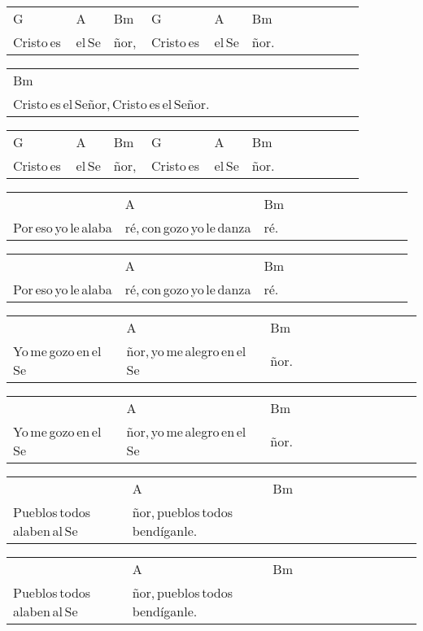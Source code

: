 \begin{multicols}{2}
\begin{minipage}{\columnwidth}
\noindent
\begin{tabular}{llllllllllll}
G&A&Bm&G&A&Bm\\
Cristo\,es\,&el\,Se&ñor,\,&Cristo\,es\,&el\,Se&ñor.
\end{tabular}

\noindent
\begin{tabular}{llllllllllll}
Bm\\
Cristo\,es\,el\,Señor,\,Cristo\,es\,el\,Señor.
\end{tabular}

\noindent
\begin{tabular}{llllllllllll}
G&A&Bm&G&A&Bm\\
Cristo\,es\,&el\,Se&ñor,\,&Cristo\,es\,&el\,Se&ñor.
\end{tabular}

\noindent
\begin{tabular}{llllllllllll}
&A&Bm\\
Por\,eso\,yo\,le\,alaba&ré,\,con\,gozo\,yo\,le\,danza&ré.
\end{tabular}

\noindent
\begin{tabular}{llllllllllll}
&A&Bm\\
Por\,eso\,yo\,le\,alaba&ré,\,con\,gozo\,yo\,le\,danza&ré.
\end{tabular}

\noindent
\begin{tabular}{llllllllllll}
&A&Bm\\
Yo\,me\,gozo\,en\,el\,Se&ñor,\,yo\,me\,alegro\,en\,el\,Se&ñor.
\end{tabular}

\noindent
\begin{tabular}{llllllllllll}
&A&Bm\\
Yo\,me\,gozo\,en\,el\,Se&ñor,\,yo\,me\,alegro\,en\,el\,Se&ñor.
\end{tabular}

\noindent
\begin{tabular}{llllllllllll}
&A&Bm\\
Pueblos\,todos\,alaben\,al\,Se&ñor,\,pueblos\,todos\,bendíganle.&
\end{tabular}

\noindent
\begin{tabular}{llllllllllll}
&A&Bm\\
Pueblos\,todos\,alaben\,al\,Se&ñor,\,pueblos\,todos\,bendíganle.&
\end{tabular}
\end{minipage}\\


\end{multicols}
